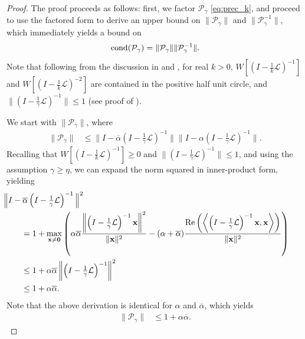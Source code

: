 \documentclass[review]{siamart}
\begin{document}
\begin{proof}
The proof proceeds as follows: first, we factor $\mathcal{P}_\gamma$ \eqref{eq:prec_k},
and proceed to use the factored form to derive an upper bound on 
$\|\mathcal{P}_\gamma\|$ and $\|\mathcal{P}_\gamma^{-1}\|$, which immediately
yields a bound on
%
\begin{align}\label{eq:cond0}
\textnormal{cond}(\mathcal{P}_\gamma) = \|\mathcal{P}_\gamma\|\|\mathcal{P}_\gamma^{-1}\|.
\end{align}
%
Note that following from the discussion in  and ,
for real $k>0$, $W\left[\left(I - \tfrac{1}{k}\mathcal{L}\right)^{-1}\right]$ and
$W\left[\left(I - \tfrac{1}{k}\mathcal{L}\right)^{-2}\right]$ are contained in
the positive half unit circle, and $\|(I - \tfrac{1}{\gamma}\mathcal{L})^{-1}\| \leq 1$
(see proof of ).

We start with $\|\mathcal{P}_\gamma\|$, where
%
\begin{align}\label{eq:CS}
\|\mathcal{P}_\gamma\| & \leq 
	\Big\|I - \overline{\alpha}\left(I - \tfrac{1}{\gamma}\mathcal{L}\right)^{-1}\Big\|
	\Big\|I - \alpha\left(I - \tfrac{1}{\gamma}\mathcal{L}\right)^{-1}\Big\|.
\end{align}
%
Recalling that $W\left[(I - \tfrac{1}{k}\mathcal{L})^{-1}\right] \geq 0$
and $\|(I - \tfrac{1}{\gamma}\mathcal{L})^{-1}\| \leq 1$, and using the
assumption $\gamma \geq \eta$, we can expand the norm squared in inner-product
form, yielding
%
\begin{align*}
&\hspace{-5ex}
\Big\|I - \overline{\alpha}\left(I - \tfrac{1}{\gamma}\mathcal{L}\right)^{-1}\Big\|^2 \\
	& = 1 + \max_{\mathbf{x}\neq\mathbf{0}} \left( \alpha\overline{\alpha}
		\frac{\left\|\left(I - \tfrac{1}{\gamma}\mathcal{L}\right)^{-1}\mathbf{x}\right\|^2
		}{\|\mathbf{x}\|^2}
	- (\alpha + \overline{\alpha})\frac{\textnormal{Re}\left(\left\langle\left(I -
		\tfrac{1}{\gamma}\mathcal{L}\right)^{-1}\mathbf{x}, \mathbf{x}\right\rangle\right)}
		{\|\mathbf{x}\|^2}\right) \\
& \leq 1 + \alpha\overline{\alpha}\left\|\left(I - \tfrac{1}{\gamma}\mathcal{L}\right)^{-1}\right\|^2 \\
& \leq 1 + \alpha\overline{\alpha}.
\end{align*}
%
Note that the above derivation is identical for $\alpha$ and $\overline{\alpha}$,
which yields
%
\begin{align} \label{eq:upper_alpha}
\|\mathcal{P}_\gamma\| & \leq 1 + \alpha\overline{\alpha}.
\end{align}
%


\end{proof}
\end{document}

